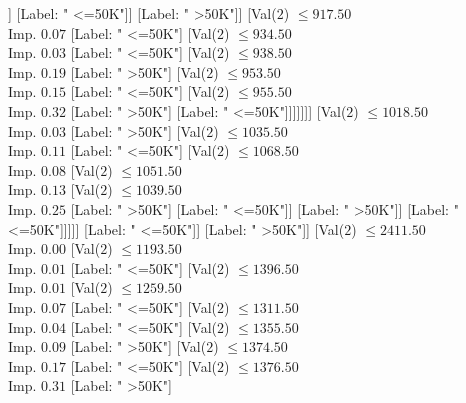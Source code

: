 \documentclass[margin=10pt]{standalone}
\begin{document}
\begin{forest}
																				[Label: " >50K"]]
																			[Label: " <=50K"]]
																		[Label: " >50K"]]
																	[Val($2$) $ \leq 917.50$ \\ Imp. $0.07$
																		[Label: " <=50K"]
																		[Val($2$) $ \leq 934.50$ \\ Imp. $0.03$
																			[Label: " <=50K"]
																			[Val($2$) $ \leq 938.50$ \\ Imp. $0.19$
																				[Label: " >50K"]
																				[Val($2$) $ \leq 953.50$ \\ Imp. $0.15$
																					[Label: " <=50K"]
																					[Val($2$) $ \leq 955.50$ \\ Imp. $0.32$
																						[Label: " >50K"]
																						[Label: " <=50K"]]]]]]]
																[Val($2$) $ \leq 1018.50$ \\ Imp. $0.03$
																	[Label: " >50K"]
																	[Val($2$) $ \leq 1035.50$ \\ Imp. $0.11$
																		[Label: " <=50K"]
																		[Val($2$) $ \leq 1068.50$ \\ Imp. $0.08$
																			[Val($2$) $ \leq 1051.50$ \\ Imp. $0.13$
																				[Val($2$) $ \leq 1039.50$ \\ Imp. $0.25$
																					[Label: " >50K"]
																					[Label: " <=50K"]]
																				[Label: " >50K"]]
																			[Label: " <=50K"]]]]]
															[Label: " <=50K"]]
														[Label: " >50K"]]
													[Val($2$) $ \leq 2411.50$ \\ Imp. $0.00$
														[Val($2$) $ \leq 1193.50$ \\ Imp. $0.01$
															[Label: " <=50K"]
															[Val($2$) $ \leq 1396.50$ \\ Imp. $0.01$
																[Val($2$) $ \leq 1259.50$ \\ Imp. $0.07$
																	[Label: " <=50K"]
																	[Val($2$) $ \leq 1311.50$ \\ Imp. $0.04$
																		[Label: " <=50K"]
																		[Val($2$) $ \leq 1355.50$ \\ Imp. $0.09$
																			[Label: " >50K"]
																			[Val($2$) $ \leq 1374.50$ \\ Imp. $0.17$
																				[Label: " <=50K"]
																				[Val($2$) $ \leq 1376.50$ \\ Imp. $0.31$
																					[Label: " >50K"]

\end{forest}
\end{document}
